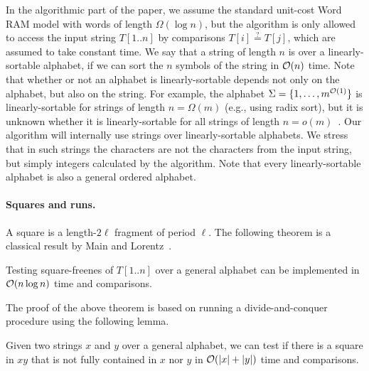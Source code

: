 In the algorithmic part of the paper, we assume the standard unit-cost Word RAM model with words of length $\Omega(\log n)$,
but the algorithm is only allowed to access the input string $T[1..n]$ by comparisons $T[i]\stackrel{?}{=}T[j]$, which are assumed to take constant time.
We say that a string of length $n$ is over a linearly-sortable alphabet, if we can sort the $n$ symbols of the string in $\mathcal{O}(n)$ time. Note that whether or not an alphabet is linearly-sortable depends not only on the alphabet, but also on the string. For example, the alphabet $\Sigma=\{1,\dots,m^{\mathcal{O}(1)}\}$ is linearly-sortable for strings of length $n = \Omega(m)$ (e.g., using radix sort), but it is unknown whether it is linearly-sortable for all strings of length $n = o(m)$~\cite{HanT02}.
Our algorithm will internally use strings over linearly-sortable alphabets. We stress that in such strings the characters are not the
characters from the input string, but simply integers calculated by the algorithm.
Note that every linearly-sortable alphabet is also a general ordered alphabet.

\paragraph{Squares and runs.}
A square is a length-$2\ell$ fragment of period $\ell$. 
The following theorem is a classical result by Main and Lorentz~\cite{Main1984}.

\begin{theorem}
\label{lem:classical}
Testing square-freenes of $T[1..n]$ over a general alphabet can be implemented in $\mathcal{O}(n\log n)$ time and comparisons.
\end{theorem}

\noindent The proof of the above theorem is based on running a divide-and-conquer procedure
using the following lemma.

\begin{lemma}
\label{lem:conquer}
Given two strings $x$ and $y$ over a general alphabet, we can test if there is a square in $xy$ that is not fully contained in $x$ nor $y$ in $\mathcal{O}(|x|+|y|)$
time and comparisons.
\end{lemma}


